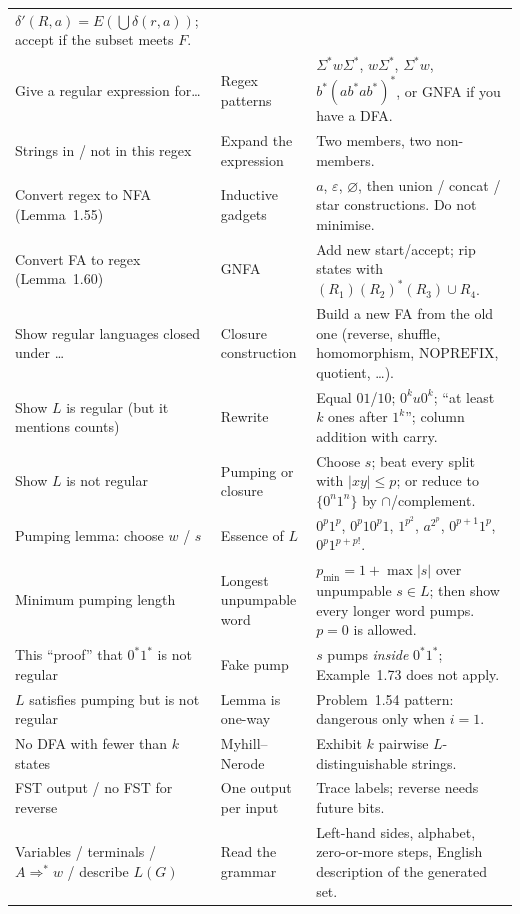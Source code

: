\documentclass[11pt,a4paper]{article}
\newcommand{\eps}{\varepsilon}
\begin{document}
{\begin{longtable}{@{}>{\raggedright\arraybackslash}p{}
                    >{\raggedright\arraybackslash}p{}
                    >{\raggedright\arraybackslash}p{}@{}}
    $\delta'(R,a)=E(\bigcup\delta(r,a))$;
    accept if the subset meets $F$. \\
Give a regular expression for\ldots
  & Regex patterns
  & $\Sigma^*w\Sigma^*$, $w\Sigma^*$, $\Sigma^*w$,
    $b^*(ab^*ab^*)^*$, or GNFA if you have a DFA. \\
Strings in / not in this regex
  & Expand the expression
  & Two members, two non-members. \\
Convert regex to NFA (Lemma~1.55)
  & Inductive gadgets
  & $a$, $\eps$, $\varnothing$, then union / concat / star
    constructions. Do not minimise. \\
Convert FA to regex (Lemma~1.60)
  & GNFA
  & Add new start/accept; rip states with
    $(R_1)(R_2)^*(R_3)\cup R_4$. \\
Show regular languages closed under \ldots
  & Closure construction
  & Build a new FA from the old one (reverse, shuffle,
    homomorphism, $\mathrm{NOPREFIX}$, quotient, \ldots). \\
Show $L$ is regular (but it mentions counts)
  & Rewrite
  & Equal $01$/$10$; $0^ku0^k$; ``at least $k$ ones after
    $1^k$''; column addition with carry. \\
Show $L$ is not regular
  & Pumping or closure
  & Choose $s$; beat every split with $|xy|\le p$;
    or reduce to $\{0^n1^n\}$ by $\cap$/complement. \\
Pumping lemma: choose $w$ / $s$
  & Essence of $L$
  & $0^p1^p$, $0^p10^p1$, $1^{p^2}$, $a^{2^p}$,
    $0^{p+1}1^p$, $0^p1^{p+p!}$. \\
Minimum pumping length
  & Longest unpumpable word
  & $p_{\min}=1+\max|s|$ over unpumpable $s\in L$; then show
    every longer word pumps. $p=0$ is allowed. \\
This ``proof'' that $0^*1^*$ is not regular
  & Fake pump
  & $s$ pumps \emph{inside} $0^*1^*$; Example~1.73 does not
    apply. \\
$L$ satisfies pumping but is not regular
  & Lemma is one-way
  & Problem~1.54 pattern: dangerous only when $i=1$. \\
No DFA with fewer than $k$ states
  & Myhill--Nerode
  & Exhibit $k$ pairwise $L$-distinguishable strings. \\
FST output / no FST for reverse
  & One output per input
  & Trace labels; reverse needs future bits. \\
Variables / terminals / $A\Rightarrow^*w$ / describe $L(G)$
  & Read the grammar
  & Left-hand sides, alphabet, zero-or-more steps, English
    description of the generated set. \\

\end{longtable}}
\end{document}
